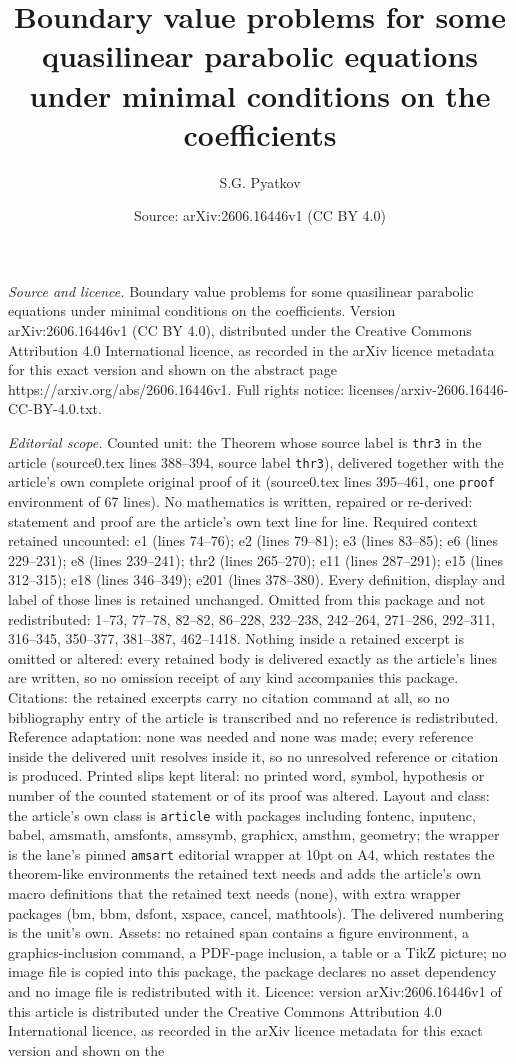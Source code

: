 \documentclass[10pt,a4paper]{amsart}
\title[Boundary value problems for some quasilinear parabolic equat]{Boundary value problems for some quasilinear parabolic equations under minimal conditions on the coefficients}
\author{S.G. Pyatkov}
\date{Source: arXiv:2606.16446v1 (CC BY 4.0)}
\begin{document}
\maketitle

\noindent\emph{Source and licence.} Boundary value problems for some quasilinear parabolic equations under minimal conditions on the coefficients. Version arXiv:2606.16446v1 (CC BY 4.0), distributed under the Creative Commons Attribution 4.0 International licence, as recorded in the arXiv licence metadata for this exact version and shown on the abstract page https://arxiv.org/abs/2606.16446v1. Full rights notice: licenses/arxiv-2606.16446-CC-BY-4.0.txt.\par\smallskip

\noindent\textit{Editorial scope.} Counted unit: the Theorem whose source label is \texttt{thr3} in the article (source0.tex lines 388--394, source label \texttt{thr3}), delivered together with the article's own complete original proof of it (source0.tex lines 395--461, one \texttt{proof} environment of 67 lines). No mathematics is written, repaired or re-derived: statement and proof are the article's own text line for line. Required context retained uncounted: e1 (lines 74--76); e2 (lines 79--81); e3 (lines 83--85); e6 (lines 229--231); e8 (lines 239--241); thr2 (lines 265--270); e11 (lines 287--291); e15 (lines 312--315); e18 (lines 346--349); e201 (lines 378--380). Every definition, display and label of those lines is retained unchanged. Omitted from this package and not redistributed: 1--73, 77--78, 82--82, 86--228, 232--238, 242--264, 271--286, 292--311, 316--345, 350--377, 381--387, 462--1418. Nothing inside a retained excerpt is omitted or altered: every retained body is delivered exactly as the article's lines are written, so no omission receipt of any kind accompanies this package. Citations: the retained excerpts carry no citation command at all, so no bibliography entry of the article is transcribed and no reference is redistributed. Reference adaptation: none was needed and none was made; every reference inside the delivered unit resolves inside it, so no unresolved reference or citation is produced. Printed slips kept literal: no printed word, symbol, hypothesis or number of the counted statement or of its proof was altered. Layout and class: the article's own class is \texttt{article} with packages including fontenc, inputenc, babel, amsmath, amsfonts, amssymb, graphicx, amsthm, geometry; the wrapper is the lane's pinned \texttt{amsart} editorial wrapper at 10pt on A4, which restates the theorem-like environments the retained text needs and adds the article's own macro definitions that the retained text needs (none), with extra wrapper packages (bm, bbm, dsfont, xspace, cancel, mathtools). The delivered numbering is the unit's own. Assets: no retained span contains a figure environment, a graphics-inclusion command, a PDF-page inclusion, a table or a TikZ picture; no image file is copied into this package, the package declares no asset dependency and no image file is redistributed with it. Licence: version arXiv:2606.16446v1 of this article is distributed under the Creative Commons Attribution 4.0 International licence, as recorded in the arXiv licence metadata for this exact version and shown on the 
\end{document}
